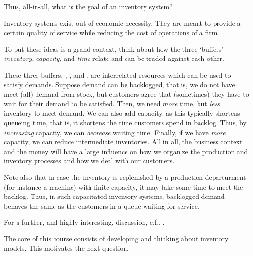 \begin{exercise}
Thus, all-in-all, what is the goal of an inventory system?


  \begin{solution}
    Inventory systems exist out of economic necessity. They are meant
    to provide a certain quality of service while reducing the cost of operations of a firm.
  \end{solution}
\end{exercise}


\begin{exercise}
  To put these ideas is a grand context, think about how the  three `buffers' \emph{inventory}, \emph{capacity}, and \emph{time} relate and can be traded against each other.
  \begin{solution}
    These three  buffers, , , and , are interrelated resources which can be used to satisfy demands. Suppose demand can be backlogged, that is, we do not have meet (all) demand from stock, but customers agree that (sometimes) they have to wait for their demand to be satisfied. Then, we need \emph{more} time, but  \emph{less} inventory to meet demand. We can also add capacity, as this typically shortens queueing time, that is, it shortens the time customers spend in backlog. Thus, by \emph{increasing} capacity, we can \emph{decrease} waiting time. Finally, if we have \emph{more} capacity, we can reduce intermediate inventories. All in all, the business context and the money will have a large influence on how we organize the production and inventory processes and how we deal with our customers. 
    
Note also that in case the inventory  is replenished by a production departurment (for instance a machine) with finite capacity, it may take some time to meet the backlog. Thus, in such capacitated inventory systems, backlogged demand  behaves  the same as the customers in a queue waiting for service. 

For a further, and highly  interesting, discussion, c.f., \cite[Chapter 6, Chapter 9]{hopp08:_factor_physic}. 
  \end{solution}
\end{exercise}

The core  of this course consists of developing and thinking about inventory models. This motivates the next question.

